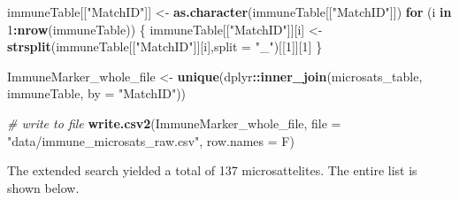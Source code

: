 \documentclass[]{article}
\newenvironment{Shaded}{\begin{snugshade}}{\end{snugshade}}
\newcommand{\KeywordTok}[1]{\textcolor[rgb]{0.13,0.29,0.53}{\textbf{#1}}}
\newcommand{\DataTypeTok}[1]{\textcolor[rgb]{0.13,0.29,0.53}{#1}}
\newcommand{\DecValTok}[1]{\textcolor[rgb]{0.00,0.00,0.81}{#1}}
\newcommand{\StringTok}[1]{\textcolor[rgb]{0.31,0.60,0.02}{#1}}
\newcommand{\CommentTok}[1]{\textcolor[rgb]{0.56,0.35,0.01}{\textit{#1}}}
\newcommand{\ControlFlowTok}[1]{\textcolor[rgb]{0.13,0.29,0.53}{\textbf{#1}}}
\newcommand{\OperatorTok}[1]{\textcolor[rgb]{0.81,0.36,0.00}{\textbf{#1}}}
\newcommand{\NormalTok}[1]{#1}
\begin{document}
\begin{Shaded}
\begin{Highlighting}[]
\NormalTok{immuneTable[[}\StringTok{"MatchID"}\NormalTok{]] <-}
\StringTok{  }\KeywordTok{as.character}\NormalTok{(immuneTable[[}\StringTok{"MatchID"}\NormalTok{]])}
\ControlFlowTok{for}\NormalTok{ (i }\ControlFlowTok{in} \DecValTok{1}\OperatorTok{:}\KeywordTok{nrow}\NormalTok{(immuneTable)) \{}
\NormalTok{  immuneTable[[}\StringTok{"MatchID"}\NormalTok{]][i] <-}
\StringTok{    }\KeywordTok{strsplit}\NormalTok{(immuneTable[[}\StringTok{"MatchID"}\NormalTok{]][i],}\DataTypeTok{split =} \StringTok{"_"}\NormalTok{)[[}\DecValTok{1}\NormalTok{]][}\DecValTok{1}\NormalTok{]}
\NormalTok{\} }

\NormalTok{ImmuneMarker_whole_file <-}
\StringTok{  }\KeywordTok{unique}\NormalTok{(dplyr}\OperatorTok{::}\KeywordTok{inner_join}\NormalTok{(microsats_table, immuneTable, }\DataTypeTok{by =} \StringTok{"MatchID"}\NormalTok{)) }

\CommentTok{# write to file}
\KeywordTok{write.csv2}\NormalTok{(ImmuneMarker_whole_file, }\DataTypeTok{file =} \StringTok{"data/immune_microsats_raw.csv"}\NormalTok{, }\DataTypeTok{row.names =}\NormalTok{ F)}
\end{Highlighting}
\end{Shaded}

The extended search yielded a total of 137 microsattelites. The entire
list is shown below.
\end{document}
